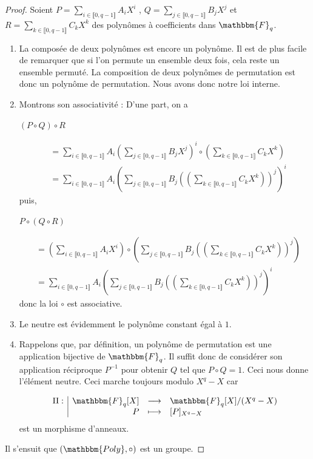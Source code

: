 \documentclass[12pt]{article}
\newcommand{\Fq}{\mathbbm{F}_q}
\newcommand{\fonction}[5]{
\begin{displaymath}
\begin{array}{l|rcl}
\displaystyle
#1 : & #2 & \longrightarrow & #3 \\
    & #4 & \longmapsto & #5
\end{array}
\end{displaymath}
}
\theoremstyle{definition}
\begin{document}
\begin{proof}
Soient $ P = \displaystyle\sum_{i \in \llbracket 0, q-1 \rrbracket} A_i X^i$ , $Q = \displaystyle\sum_{j \in \llbracket 0, q-1 \rrbracket} B_j X^j$ et $R = \displaystyle\sum_{k \in \llbracket 0, q-1 \rrbracket} C_k X^k$ des polynômes à coefficients dans $\Fq$. \newline
\break
	\begin{enumerate}[label=$\clubsuit$, font=\small  \color{black}]
		\item La composée de deux polynômes est encore un polynôme. Il est de plus facile de remarquer que si l'on permute un ensemble deux fois, cela reste un ensemble permuté. La composition de deux polynômes de permutation est donc un polynôme de permutation. Nous avons donc notre loi interne.
		\item Montrons son associativité : \newline
D'une part, on a
			\begin{center} $\left( P\circ Q \right) \circ R$ \end{center}
			\begin{align*} 
&= \displaystyle\sum_{i \in \llbracket 0, q-1 \rrbracket} A_i\left(\displaystyle\sum_{j \in \llbracket 0, q-1 \rrbracket} B_j X^j\right)^i \circ \left(\displaystyle\sum_{k \in \llbracket 0, q-1 \rrbracket} C_k X^k\right) \\ 
&= \displaystyle\sum_{i \in \llbracket 0, q-1 \rrbracket} A_i\left(\displaystyle\sum_{j \in \llbracket 0, q-1 \rrbracket} B_j \left(\left(\displaystyle\sum_{k \in \llbracket 0, q-1 \rrbracket} C_k X^k\right)\right)^j\right)^i
			\end{align*} 
puis, 
			\begin{center} $P\circ \left(Q \circ R\right)$ \end{center}
			\begin{align*} 
&= \left(\displaystyle\sum_{i \in \llbracket 0, q-1 \rrbracket} A_i X^i\right) \circ \left(\displaystyle\sum_{j \in \llbracket 0, q-1 \rrbracket} B_j \left(\left(\displaystyle\sum_{k \in \llbracket 0, q-1 \rrbracket} C_k X^k\right)\right)^j\right) \\
&=  \displaystyle\sum_{i \in \llbracket 0, q-1 \rrbracket} A_i\left(\displaystyle\sum_{j \in \llbracket 0, q-1 \rrbracket} B_j \left(\left(\displaystyle\sum_{k \in \llbracket 0, q-1 \rrbracket} C_k X^k\right)\right)^j\right)^i
			\end{align*} 
donc la loi $\circ$ est associative.
	\item Le neutre est évidemment le polynôme constant égal à $1$.
	\item Rappelons que, par définition, un polynôme de permutation est une application bijective de $\Fq$. Il suffit donc de considérer son application réciproque $P^{-1}$ pour obtenir $Q$ tel que $P\circ Q = 1$. Ceci nous donne l'élément neutre. Ceci marche toujours modulo $X^q - X$ car
	\fonction{\Pi}{\Fq[X]}{\Fq[X] / (X^q - X)}{P}{[P]_{X^q - X}} est un morphisme d'anneaux.
	\end{enumerate}	
Il s'ensuit que $(\mathbbm{Poly}, \circ)$ est un groupe. 
\end{proof}
\end{document}
